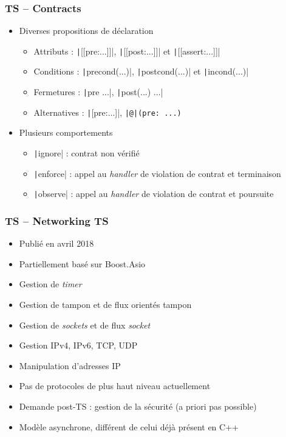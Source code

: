 \documentclass[C++.tex]{subfiles}
\begin{document}
\begin{frame}[fragile]
	\frametitle{TS -- Contracts}
	\begin{itemize}
		\item Diverses propositions de déclaration
		\begin{itemize}
			\item Attributs : \texttt|[[pre:...]]|, \texttt|[[post:...]]| et  \texttt|[[assert:...]]|
			\item Conditions : \texttt|precond(...)|, \texttt|postcond(...)| et \texttt|incond(...)|
			\item Fermetures : \texttt|pre {...}|, \texttt|post(...) {...}|
			\item Alternatives : \texttt|[{pre:...}]|, \texttt{|@|(pre: ...)}
		\end{itemize}
		\item Plusieurs comportements
		\begin{itemize}
			\item \texttt|ignore| : contrat non vérifié
			\item \texttt|enforce| : appel au \textit{handler} de violation de contrat et terminaison
			\item \texttt|observe| : appel au \textit{handler} de violation de contrat et poursuite

		\end{itemize}
	\end{itemize}
\end{frame}

\begin{frame}[fragile]
	\frametitle{TS -- Networking TS}
	\begin{itemize}
		\item Publié en avril 2018
		\item Partiellement basé sur Boost.Asio
		\item Gestion de \textit{timer}
		\item Gestion de tampon et de flux orientés tampon
		\item Gestion de \textit{sockets} et de flux \textit{socket}
		\item Gestion IPv4, IPv6, TCP, UDP
		\item Manipulation d'adresses IP
		\item Pas de protocoles de plus haut niveau actuellement
		\item Demande post-TS : gestion de la sécurité (a priori pas possible)
		\item Modèle asynchrone, différent de celui déjà présent en C++
	\end{itemize}
\end{frame}
\end{document}
